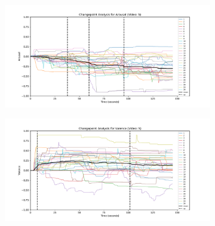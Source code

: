 \documentclass[11pt, letterpaper]{article}
\begin{document}
 \begin{figure} \ContinuedFloat
        \centering
    \begin{subfigure}[t]{0.49\textwidth}
        \centering
        \includegraphics[width=\linewidth]{changepoints_V5_arousal_avg_all_data}
        \caption{} \label{fig:changepoints_V5_arousal_avg_all_data}
    \end{subfigure}
    \hfill
    \begin{subfigure}[t]{0.49\textwidth}
        \centering
        \includegraphics[width=\linewidth]{changepoints_V5_valence_avg_all_data} 
        \caption{} \label{fig:changepoints_V5_valence_avg_all_data}
    \end{subfigure}

    \vspace{1cm}
    

\end{figure}
\end{document}
